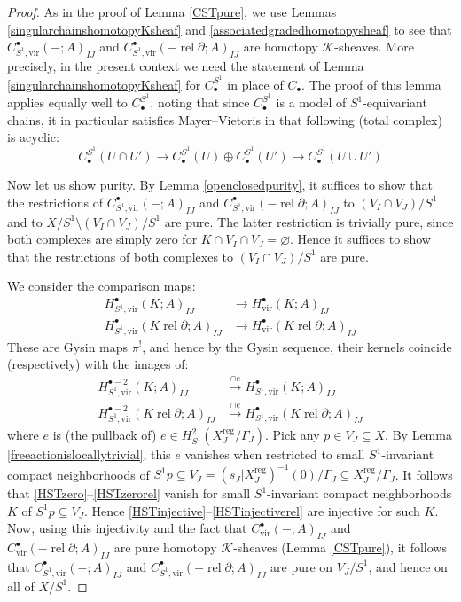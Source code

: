 \documentclass[12pt]{article}
\theoremstyle{definition}
\theoremstyle{remark}
\numberwithin{equation}{subsection}
\newcommand{\K}{\mathcal K}
\newcommand{\vir}{\mathrm{vir}}
\newcommand{\reg}{\mathrm{reg}}
\newcommand{\rel}{\operatorname{rel}}
\begin{document}
\begin{proof}
As in the proof of Lemma \ref{CSTpure}, we use Lemmas \ref{singularchainshomotopyKsheaf} and \ref{associatedgradedhomotopysheaf} to see that $C^\bullet_{S^1,\vir}(-;A)_{IJ}$ and $C^\bullet_{S^1,\vir}(-\rel\partial;A)_{IJ}$ are homotopy $\K$-sheaves.  More precisely, in the present context we need the statement of Lemma \ref{singularchainshomotopyKsheaf} for $C_\bullet^{S^1}$ in place of $C_\bullet$.  The proof of this lemma applies equally well to $C_\bullet^{S^1}$, noting that since $C_\bullet^{S^1}$ is a model of $S^1$-equivariant chains, it in particular satisfies Mayer--Vietoris in that following (total complex) is acyclic:
\begin{equation}
C_\bullet^{S^1}(U\cap U')\to C_\bullet^{S^1}(U)\oplus C_\bullet^{S^1}(U')\to C_\bullet^{S^1}(U\cup U')
\end{equation}

Now let us show purity.  By Lemma \ref{openclosedpurity}, it suffices to show that the restrictions of $C^\bullet_{S^1,\vir}(-;A)_{IJ}$ and $C^\bullet_{S^1,\vir}(-\rel\partial;A)_{IJ}$ to $(V_I\cap V_J)/S^1$ and to $X/S^1\setminus(V_I\cap V_J)/S^1$ are pure.  The latter restriction is trivially pure, since both complexes are simply zero for $K\cap V_I\cap V_J=\varnothing$.  Hence it suffices to show that the restrictions of both complexes to $(V_I\cap V_J)/S^1$ are pure.

We consider the comparison maps:
\begin{align}
\label{HSTinjective}H^\bullet_{S^1,\vir}(K;A)_{IJ}&\to H^\bullet_\vir(K;A)_{IJ}\\
\label{HSTinjectiverel}H^\bullet_{S^1,\vir}(K\rel\partial;A)_{IJ}&\to H^\bullet_\vir(K\rel\partial;A)_{IJ}
\end{align}
These are Gysin maps $\pi^!$, and hence by the Gysin sequence, their kernels coincide (respectively) with the images of:
\begin{align}
\label{HSTzero}H^{\bullet-2}_{S^1,\vir}(K;A)_{IJ}&\xrightarrow{\cap e}H^\bullet_{S^1,\vir}(K;A)_{IJ}\\
\label{HSTzerorel}H^{\bullet-2}_{S^1,\vir}(K\rel\partial;A)_{IJ}&\xrightarrow{\cap e}H^\bullet_{S^1,\vir}(K\rel\partial;A)_{IJ}
\end{align}
where $e$ is (the pullback of) $e\in H^2_{S^1}(X_J^\reg/\Gamma_J)$.  Pick any $p\in V_J\subseteq X$.  By Lemma \ref{freeactionislocallytrivial}, this $e$ vanishes when restricted to small $S^1$-invariant compact neighborhoods of $S^1p\subseteq V_J=(s_J|X_J^\reg)^{-1}(0)/\Gamma_J\subseteq X_J^\reg/\Gamma_J$.  It follows that \eqref{HSTzero}--\eqref{HSTzerorel} vanish for small $S^1$-invariant compact neighborhoods $K$ of $S^1p\subseteq V_J$.  Hence \eqref{HSTinjective}--\eqref{HSTinjectiverel} are injective for such $K$.  Now, using this injectivity and the fact that $C^\bullet_\vir(-;A)_{IJ}$ and $C^\bullet_\vir(-\rel\partial;A)_{IJ}$ are pure homotopy $\K$-sheaves (Lemma \ref{CSTpure}), it follows that $C^\bullet_{S^1,\vir}(-;A)_{IJ}$ and $C^\bullet_{S^1,\vir}(-\rel\partial;A)_{IJ}$ are pure on $V_J/S^1$, and hence on all of $X/S^1$.


\end{proof}
\end{document}

